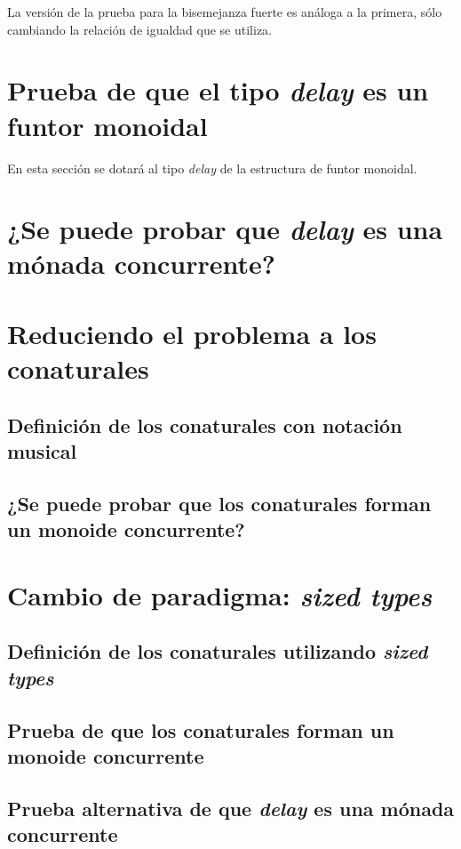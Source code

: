 La versión de la prueba para la bisemejanza fuerte es análoga a la primera, sólo cambiando la relación de igualdad que se utiliza. 



\section{Prueba de que el tipo \textit{delay} es un funtor monoidal}

En esta sección se dotará al tipo \textit{delay} de la estructura de funtor monoidal.

\section{¿Se puede probar que \textit{delay} es una mónada concurrente?}

\section{Reduciendo el problema a los conaturales}

\subsection{Definición de los conaturales con notación musical}

\subsection{¿Se puede probar que los conaturales forman un monoide concurrente?}

\section{Cambio de paradigma: \textit{sized types}}

\subsection{Definición de los conaturales utilizando \textit{sized types}}

\subsection{Prueba de que los conaturales forman un monoide concurrente}

\subsection{Prueba alternativa de que \textit{delay} es una mónada concurrente}